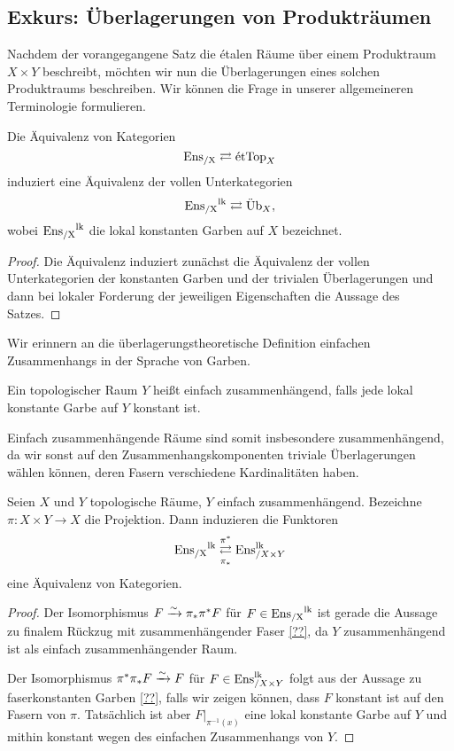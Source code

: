\subsection{Exkurs: Überlagerungen von Produkträumen}

Nachdem der vorangegangene Satz die étalen Räume über einem
Produktraum $X \times Y$ beschreibt, möchten wir nun die
Überlagerungen eines solchen Produktraums beschreiben. Wir können die
Frage in unserer allgemeineren Terminologie formulieren.
\begin{prop}
  Die Äquivalenz von Kategorien
  \[ \operatorname{Ens_{/X}} \rightleftarrows \mathrm{\acute{e}tTop}_X \]
  induziert eine Äquivalenz der vollen Unterkategorien
  \[ \operatorname{Ens_{/X}}^{\operatorname{lk}} \rightleftarrows \mathrm{\ddot{U}b}_X, \]
  wobei $\operatorname{Ens_{/X}}^{\operatorname{lk}}$ die lokal konstanten Garben auf $X$ bezeichnet.
\end{prop}
\begin{proof}
  Die Äquivalenz induziert zunächst die Äquivalenz der vollen
  Unterkategorien der konstanten Garben und der trivialen
  Überlagerungen und dann bei lokaler Forderung der jeweiligen
  Eigenschaften die Aussage des Satzes.
\end{proof}

Wir erinnern an die überlagerungstheoretische Definition einfachen
Zusammenhangs in der Sprache von Garben.
\begin{defn}
  Ein topologischer Raum $Y$ heißt einfach zusammenhängend, falls jede
  lokal konstante Garbe auf $Y$ konstant ist.
\end{defn}
Einfach zusammenhängende Räume sind somit insbesondere
zusammenhängend, da wir sonst auf den Zusammenhangskomponenten
triviale Überlagerungen wählen können, deren Fasern verschiedene
Kardinalitäten haben.

\begin{satz}
  Seien $X$ und $Y$ topologische Räume, $Y$ einfach
  zusammenhängend. Bezeichne $\pi: X \times Y \to X$ die
  Projektion. Dann induzieren die Funktoren  
  \[ \operatorname{Ens_{/X}}^{\operatorname{lk}}
  \mathrel{\mathop{\rightleftarrows}^{\pi^*}_{\pi_*}}
  \operatorname{Ens}_{/X \times Y}^{\operatorname{lk}} \]
  eine Äquivalenz von Kategorien.
\end{satz}
\begin{proof}
  Der Isomorphismus $F \xrightarrow[]{\sim} \pi_* \pi^* F$ für $F \in \operatorname{Ens_{/X}}^{\operatorname{lk}}$ ist
  gerade die Aussage zu finalem Rückzug mit zusammenhängender
  Faser \ref{??}, da $Y$ zusammenhängend ist als einfach
  zusammenhängender Raum.

  Der Isomorphismus $\pi^* \pi_* F \xrightarrow[]{\sim} F$ für $F \in \operatorname{Ens}_{/X \times
  Y}^{\operatorname{lk}}$ folgt aus der Aussage zu faserkonstanten Garben \ref{??},
  falls wir zeigen können, dass $F$ konstant ist auf den Fasern von
  $\pi$. Tatsächlich ist aber $F|_{\pi^{-1}(x)}$ eine lokal konstante
  Garbe auf $Y$ und mithin konstant wegen des einfachen Zusammenhangs
  von $Y$. 
\end{proof}

